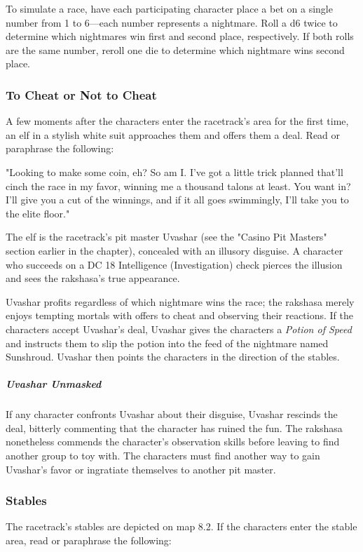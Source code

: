 \documentclass[10pt,a4paper,twoside,bg=print,twocolumn,openany,nodeprecatedcode]{dndbook}
\begin{document}
To simulate a race, have each participating character place a bet on a single number from 1 to 6—each number represents a nightmare. Roll a d6 twice to determine which nightmares win first and second place, respectively. If both rolls are the same number, reroll one die to determine which nightmare wins second place.

\subsubsection{To Cheat or Not to Cheat}
A few moments after the characters enter the racetrack's area for the first time, an elf in a stylish white suit approaches them and offers them a deal. Read or paraphrase the following:

\begin{DndReadAloud}{}
"Looking to make some coin, eh? So am I. I've got a little trick planned that'll cinch the race in my favor, winning me a thousand talons at least. You want in? I'll give you a cut of the winnings, and if it all goes swimmingly, I'll take you to the elite floor."

\end{DndReadAloud}

The elf is the racetrack's pit master Uvashar (see the "Casino Pit Masters" section earlier in the chapter), concealed with an illusory disguise. A character who succeeds on a DC 18 Intelligence (Investigation) check pierces the illusion and sees the rakshasa's true appearance.

Uvashar profits regardless of which nightmare wins the race; the rakshasa merely enjoys tempting mortals with offers to cheat and observing their reactions. If the characters accept Uvashar's deal, Uvashar gives the characters a \textit{Potion of Speed} and instructs them to slip the potion into the feed of the nightmare named Sunshroud. Uvashar then points the characters in the direction of the stables.

\subparagraph{Uvashar Unmasked}
If any character confronts Uvashar about their disguise, Uvashar rescinds the deal, bitterly commenting that the character has ruined the fun. The rakshasa nonetheless commends the character's observation skills before leaving to find another group to toy with. The characters must find another way to gain Uvashar's favor or ingratiate themselves to another pit master.

\subsubsection{Stables}
The racetrack's stables are depicted on map 8.2. If the characters enter the stable area, read or paraphrase the following:
\end{document}
